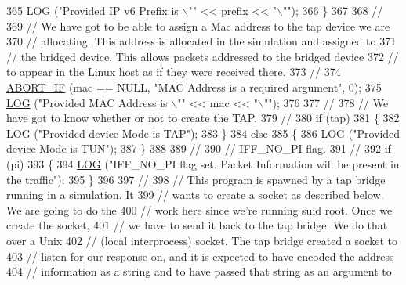 \begin{DoxyCode}
365       \hyperlink{creator-utils_8h_a158a8c64f24645c7478298399825737f}{LOG} (\textcolor{stringliteral}{"Provided IP v6 Prefix is \(\backslash\)""} << prefix << \textcolor{stringliteral}{"\(\backslash\)""});
366     \}
367 
368   \textcolor{comment}{//}
369   \textcolor{comment}{// We have got to be able to assign a Mac address to the tap device we are}
370   \textcolor{comment}{// allocating.  This address is allocated in the simulation and assigned to}
371   \textcolor{comment}{// the bridged device.  This allows packets addressed to the bridged device}
372   \textcolor{comment}{// to appear in the Linux host as if they were received there.}
373   \textcolor{comment}{//}
374   \hyperlink{creator-utils_8h_a91c11c90ad2f1672fbd3c031038dce16}{ABORT\_IF} (mac == NULL, \textcolor{stringliteral}{"MAC Address is a required argument"}, 0);
375   \hyperlink{creator-utils_8h_a158a8c64f24645c7478298399825737f}{LOG} (\textcolor{stringliteral}{"Provided MAC Address is \(\backslash\)""} << mac << \textcolor{stringliteral}{"\(\backslash\)""});
376 
377   \textcolor{comment}{//}
378   \textcolor{comment}{// We have got to know whether or not to create the TAP.}
379   \textcolor{comment}{//}
380   \textcolor{keywordflow}{if} (tap)
381     \{
382       \hyperlink{creator-utils_8h_a158a8c64f24645c7478298399825737f}{LOG} (\textcolor{stringliteral}{"Provided device Mode is TAP"});
383     \}
384   \textcolor{keywordflow}{else}
385     \{
386       \hyperlink{creator-utils_8h_a158a8c64f24645c7478298399825737f}{LOG} (\textcolor{stringliteral}{"Provided device Mode is TUN"});
387     \}
388 
389   \textcolor{comment}{//}
390   \textcolor{comment}{// IFF\_NO\_PI flag.}
391   \textcolor{comment}{//}
392   \textcolor{keywordflow}{if} (pi)
393     \{
394       \hyperlink{creator-utils_8h_a158a8c64f24645c7478298399825737f}{LOG} (\textcolor{stringliteral}{"IFF\_NO\_PI flag set. Packet Information will be present in the traffic"});
395     \}
396 
397   \textcolor{comment}{//}
398   \textcolor{comment}{// This program is spawned by a tap bridge running in a simulation.  It}
399   \textcolor{comment}{// wants to create a socket as described below.  We are going to do the}
400   \textcolor{comment}{// work here since we're running suid root.  Once we create the socket,}
401   \textcolor{comment}{// we have to send it back to the tap bridge.  We do that over a Unix}
402   \textcolor{comment}{// (local interprocess) socket.  The tap bridge created a socket to}
403   \textcolor{comment}{// listen for our response on, and it is expected to have encoded the address}
404   \textcolor{comment}{// information as a string and to have passed that string as an argument to}

\end{DoxyCode}
